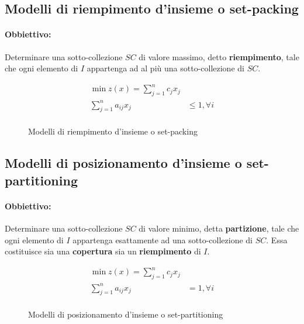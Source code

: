 \documentclass[\main/main.tex]{subfiles}
\begin{document}
\subsection{Modelli di riempimento d'insieme o set-packing}
\paragraph*{Obbiettivo:} Determinare una sotto-collezione $SC$ di valore massimo, detto \textbf{riempimento}, tale che ogni elemento di $I$ appartenga ad al più una sotto-collezione di $SC$.


\begin{figure}
  \begin{align*}
    \min z(x) = \sum_{j=1}^n c_j x_j            \\
    \sum_{j=1}^n a_{ij} x_j & \leq 1, \forall i \\
  \end{align*}
  \caption{Modelli di riempimento d'insieme o set-packing}
\end{figure}

\subsection{Modelli di posizionamento d'insieme o set-partitioning}
\paragraph*{Obbiettivo:} Determinare una sotto-collezione $SC$ di valore minimo, detta \textbf{partizione}, tale che ogni elemento di $I$ appartenga esattamente ad una sotto-collezione di $SC$. Essa costituisce sia una \textbf{copertura} sia un \textbf{riempimento} di $I$.

\begin{figure}
  \begin{align*}
    \min z(x) = \sum_{j=1}^n c_j x_j         \\
    \sum_{j=1}^n a_{ij} x_j & = 1, \forall i \\
  \end{align*}
  \caption{Modelli di posizionamento d'insieme o set-partitioning}
\end{figure}
\end{document}
